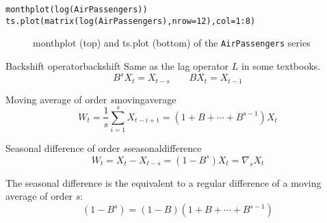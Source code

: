 \begin{verbatim}
monthplot(log(AirPassengers))
ts.plot(matrix(log(AirPassengers),nrow=12),col=1:8)
\end{verbatim}

\begin{figure}[H]
	\caption{monthplot (top) and ts.plot (bottom) of the \texttt{AirPassengers} series}
\end{figure}

\begin{definition}{Backshift operator}{backshift}
	Same as the lag operator $L$ in some textbooks.
	\begin{equation}
		B^s X_t = X_{t-s} \qquad BX_t = X_{t-1}
	\end{equation}
\end{definition}

\begin{definition}{Moving average of order $s$}{movingaverage}
	\begin{equation}
		W_t = \frac{1}{s} \sum_{i=1}^s X_{t-i+1} = (1 + B + \cdots + B^{s-1}) X_t
	\end{equation}
\end{definition}

\begin{definition}{Seasonal difference of order $s$}{seasonaldifference}
	\begin{equation}
		W_t = X_t - X_{t-s} = (1 - B^s) X_t = \nabla_s X_t
	\end{equation}
	\tcblower
	\begin{note}
		The seasonal difference is the equivalent to a regular difference of a
		moving average of order $s$:
		\begin{equation}
			(1 - B^s) = (1 - B) (1 + B + \cdots + B^{s-1})
		\end{equation}
	\end{note}
\end{definition}

